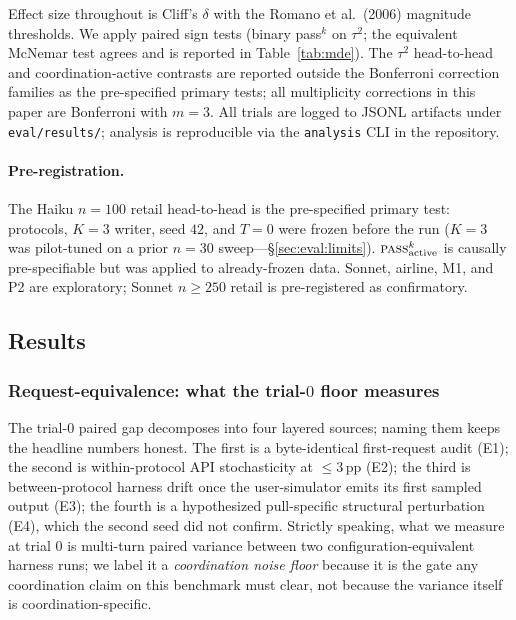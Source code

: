Effect size throughout is Cliff's $\delta$ with the Romano et
al.\ (2006) magnitude thresholds. We apply paired sign tests
(binary pass$^k$ on $\tau^2$; the equivalent McNemar test agrees
and is reported in Table~\ref{tab:mde}). The $\tau^2$
head-to-head and coordination-active contrasts are reported
outside the Bonferroni correction families as the pre-specified
primary tests; all multiplicity corrections in this paper are
Bonferroni with $m{=}3$. All trials are logged to JSONL artifacts under
\texttt{eval/results/}; analysis is reproducible via the
\texttt{analysis} CLI in the repository.

\paragraph{Pre-registration.}  The Haiku $n{=}100$ retail
head-to-head is the pre-specified primary test: protocols,
$K{=}3$ writer, seed $42$, and $T{=}0$ were frozen before the run
($K{=}3$ was pilot-tuned on a prior $n{=}30$
sweep---\S\ref{sec:eval:limits}).
$\textsc{pass}^k_{\mathrm{active}}$ is causally pre-specifiable but
was applied to already-frozen data.  Sonnet, airline, M1, and P2
are exploratory; Sonnet $n{\geq}250$ retail is pre-registered as
confirmatory.


\subsection{Results}
\label{sec:eval:results}

\subsubsection{Request-equivalence: what the trial-$0$ floor
measures}
\label{sec:eval:request-equivalence}

The trial-$0$ paired gap decomposes into four layered sources;
naming them keeps the headline numbers honest. The first is a
byte-identical first-request audit (E1); the second is
within-protocol API stochasticity at $\leq 3$\,pp (E2); the
third is between-protocol harness drift once the user-simulator
emits its first sampled output (E3); the fourth is a
hypothesized pull-specific structural perturbation (E4), which
the second seed did not confirm.
Strictly speaking, what we measure at trial $0$ is multi-turn
paired variance between two configuration-equivalent harness
runs; we label it a \emph{coordination noise floor} because it
is the gate any coordination claim on this benchmark must
clear, not because the variance itself is coordination-specific.

